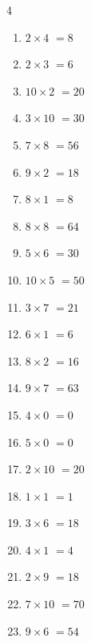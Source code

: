 \begin{multicols}{4}
\begin{enumerate}
  \item $2\times 4$
        $=8$

  \item $2\times 3$
        $=6$

  \item $10\times 2$
        $=20$

  \item $3\times 10$
        $=30$

  \item $7\times 8$
        $=56$

  \item $9\times 2$
        $=18$

\columnbreak %

  \item $8\times 1$
        $=8$

  \item $8\times 8$
        $=64$

  \item $5\times 6$
        $=30$

  \item $10\times 5$
        $=50$

  \item $3\times 7$
        $=21$

  \item $6\times 1$
        $=6$

  \item $8\times 2$
        $=16$

  \item $9\times 7$
        $=63$

  \item $4\times 0$
        $=0$

  \item $5\times 0$
        $=0$

  \item $2\times 10$
        $=20$

  \item $1\times 1$
        $=1$

  \item $3\times 6$
        $=18$

  \item $4\times 1$
        $=4$

  \item $2\times 9$
        $=18$

  \item $7\times 10$
        $=70$

  \item $9\times 6$
        $=54$


\end{enumerate}
\end{multicols}
